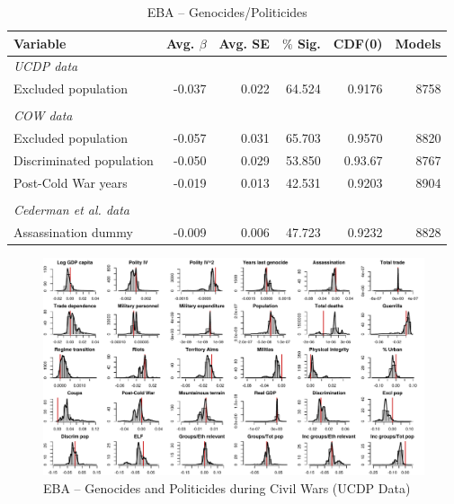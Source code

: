 \begin{table}[H]
\centering
\begin{tabular}{lrrrrr}
\hline
\textbf{Variable} & \textbf{Avg. $\beta$} & \textbf{Avg. SE} & \textbf{$\%$ Sig.} & \textbf{CDF(0)} & \textbf{Models} \\ \hline
\textit{UCDP data} &  &  &  &  &  \\
Excluded population & -0.037 & 0.022 & 64.524 & 0.9176 & 8758 \\
 &  &  &  &  &  \\
\textit{COW data} &  &  &  &  &  \\
Excluded population & -0.057 & 0.031 & 65.703 & 0.9570 & 8820 \\
Discriminated population & -0.050 & 0.029 & 53.850 & 0.93.67 & 8767 \\
Post-Cold War years & -0.019 & 0.013 & 42.531 & 0.9203 & 8904 \\
 &  &  &  &  &  \\
\textit{Cederman et al. data} &  &  &  &  &  \\
Assassination dummy & -0.009 & 0.006 & 47.723 & 0.9232 & 8828 \\ \hline
\end{tabular}
\caption{EBA -- Genocides/Politicides}
\label{tab:uamk1}
\end{table}

\newpage
\clearpage
\begin{figure}
    \centering
    \includegraphics[width=\textwidth]{images/uamk-ucdp.pdf}
    \caption{EBA -- Genocides and Politicides during Civil Wars (UCDP Data)}
    \label{fig:uamk-ucdp}
\end{figure}
\clearpage

